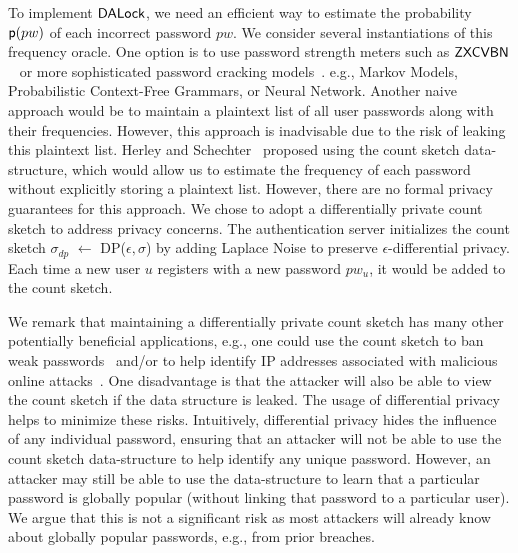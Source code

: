 To implement $\mathsf{DALock}$, we need an efficient way to estimate the probability $\textsf{p}(pw)$ of each incorrect password $pw$. We consider several instantiations of this frequency oracle. One option is to use password strength meters such as $\mathsf{ZXCVBN}$ ~\cite{USENIX:Wheeler16} or more sophisticated password cracking models~\cite{ USENIX:USBCCKKMMS15,USENIX:MUSKBCC16}. e.g., Markov Models, Probabilistic Context-Free Grammars, or Neural Network. Another naive approach would be to maintain a plaintext list of all user passwords along with their frequencies. However, this approach is inadvisable due to the risk of leaking this plaintext list. Herley and Schechter~\cite{HTS:SchHerMit10} proposed using the count sketch data-structure, which would allow us to estimate the frequency of each password without explicitly storing a plaintext list. However, there are no formal privacy guarantees for this approach. We chose to adopt a differentially private count sketch to address privacy concerns. The authentication server initializes the count sketch $\sigma_{dp}$ $\leftarrow$  DP($\epsilon, \sigma$) by adding Laplace Noise to preserve $\epsilon$-differential privacy. Each time a new user $u$ registers with a new password $pw_u$, it would be added to the count sketch.

We remark that maintaining a differentially private count sketch has many other potentially beneficial applications, e.g., one could use the count sketch to ban weak passwords~\cite{HTS:SchHerMit10} and/or to help identify IP addresses associated with malicious online attacks~\cite{EuroSP:THS19}. One disadvantage is that the attacker will also be able to view the count sketch if the data structure is leaked. The usage of differential privacy helps to minimize these risks. Intuitively, differential privacy hides the influence of any individual password, ensuring that an attacker will not be able to use the count sketch data-structure to help identify any unique password. However, an attacker may still be able to use the data-structure to learn that a particular password is globally popular (without linking that password to a particular user). We argue that this is not a significant risk as most attackers will already know about globally popular passwords, e.g., from prior breaches. 
